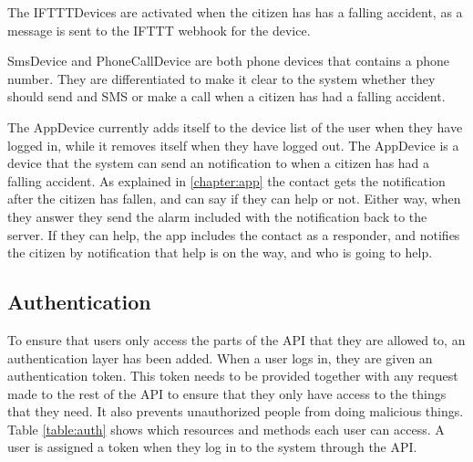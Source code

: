 The IFTTTDevices are activated when the citizen has has a falling accident, as a message is sent to the IFTTT webhook for the device.

SmsDevice and PhoneCallDevice are both phone devices that contains a phone number. They are differentiated to make it clear to the system whether they should send and SMS or make a call when a citizen has had a falling accident.

The AppDevice currently adds itself to the device list of the user when they have logged in, while it removes itself when they have logged out. The AppDevice is a device that the system can send an notification to when a citizen has had a falling accident.
As explained in \ref{chapter:app} the contact gets the notification after the citizen has fallen, and can say if they can help or not. Either way, when they answer they send the alarm included with the notification back to the server. If they can help, the app includes the contact as a responder, and notifies the citizen by notification that help is on the way, and who is going to help.

\subsection*{Authentication}

To ensure that users only access the parts of the API that they are allowed to, an authentication layer has been added. When a user logs in, they are given an authentication token. This token needs to be provided together with any request made to the rest of the API to ensure that they only have access to the things that they need. It also prevents unauthorized people from doing malicious things. Table \ref{table:auth} shows which resources and methods each user can access. A user is assigned a token when they log in to the system through the API.


